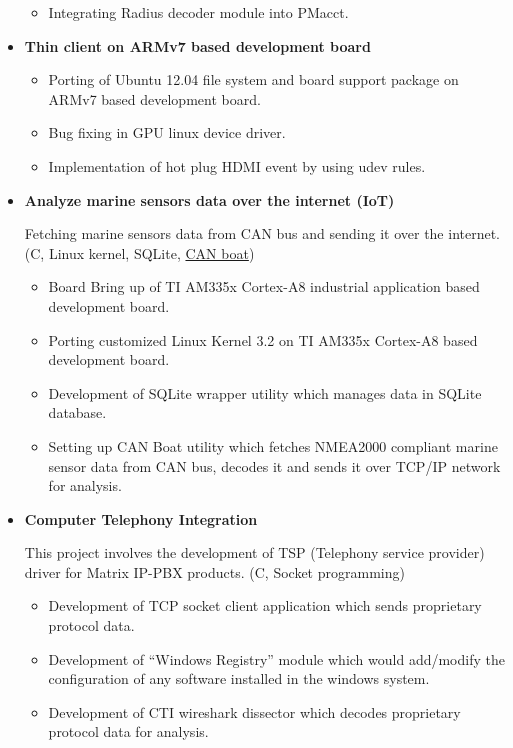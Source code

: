 \documentclass[letterpaper,10pt]{article}
\newcommand{\resitem}[1]{\item #1 \vspace{-2pt}}
\begin{document}
\begin{itemize}
\begin{itemize}
		\resitem{Integrating Radius decoder module into PMacct.}
	\end{itemize}
	
\item
    \textbf{Thin client on ARMv7 based development board}
    
	\begin{itemize}
	    \resitem{Porting of Ubuntu 12.04 file system and board support package on ARMv7 based development board.}
	    
	    \resitem{Bug fixing in GPU linux device driver.}
	    
	    \resitem{Implementation of hot plug HDMI event by using udev rules.}
	    
	\end{itemize}
	
\item
    \textbf{Analyze marine sensors data over the internet (IoT)}
	
    Fetching marine sensors data from CAN bus and sending it over the internet. (C, Linux kernel, SQLite, \href{https://github.com/mehul-m-prajapati/canboa}{CAN boat})
    
	\begin{itemize}
	    \resitem{Board Bring up of TI AM335x Cortex-A8 industrial application based development board.}
	
	    \resitem{Porting customized Linux Kernel 3.2 on TI AM335x Cortex-A8 based development board.}
	    
	    \resitem{Development of SQLite wrapper utility which manages data in SQLite database.}
	    
	    \resitem{Setting up CAN Boat utility which fetches NMEA2000 compliant marine sensor data from CAN bus, decodes it and sends it over TCP/IP network for analysis.}

	\end{itemize}
	
\item
   \textbf{Computer Telephony Integration}
    
    This project involves the development of TSP (Telephony service provider) driver for Matrix IP-PBX products. (C, Socket programming)
    
	\begin{itemize}
	    \resitem{Development of TCP socket client application which sends proprietary protocol data.}
	    
	    \resitem{Development of “Windows Registry” module which would add/modify the configuration of any software installed in the windows system.}
	    
	    \resitem{Development of CTI wireshark dissector which decodes proprietary protocol data for analysis.}
	    
	\end{itemize}

\end{itemize}
\end{document}
